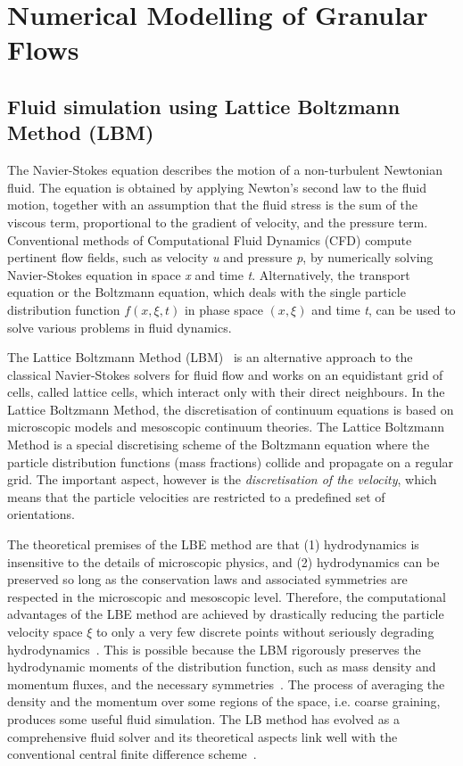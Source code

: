 \chapter{Numerical Modelling of Granular Flows}
\section{Fluid simulation using Lattice Boltzmann Method (LBM)}
The Navier-Stokes equation describes the motion of a non-turbulent Newtonian fluid. The equation is obtained by applying Newton's second law to the fluid motion, together with an assumption that the fluid stress is the sum of the viscous term, proportional to the gradient of velocity, and the pressure term. Conventional methods of Computational Fluid Dynamics (CFD) compute pertinent flow fields, such as velocity \textit{u} and pressure \textit{p}, by numerically solving Navier-Stokes equation in space \textit{x} and time \textit{t}. Alternatively, the transport equation or the Boltzmann equation, which deals with the single particle distribution function $f(x,\xi,t)$ in phase space $(x,\xi)$ and time \textit{t}, can be used to solve various problems in fluid dynamics. 

The Lattice Boltzmann Method (LBM)~\citep{He1997a,He1997b,Chen1998,Mei2000,Han2007,Zhou2012} is an alternative approach to the classical Navier-Stokes solvers for fluid flow and works on an equidistant grid of cells, called lattice cells, which interact only with their direct neighbours. In the Lattice Boltzmann Method, the discretisation of continuum equations is based on microscopic models and mesoscopic continuum theories. The Lattice Boltzmann Method is a special discretising scheme of the Boltzmann equation where the particle distribution functions (mass fractions) collide and propagate on a regular grid. The important aspect, however is the \textit{discretisation of the velocity}, which means that the particle velocities are restricted to a predefined set of orientations.

The theoretical premises of the LBE method are that (1) hydrodynamics is insensitive to the details of microscopic physics, and (2) hydrodynamics can be preserved so long as the conservation laws and associated symmetries are respected in the microscopic and mesoscopic level. Therefore, the computational advantages of the LBE method are achieved by drastically reducing the particle velocity space $\xi$ to only a very few discrete points without seriously degrading hydrodynamics~\citep{Mei2000}. This is possible because the LBM rigorously preserves the hydrodynamic moments of the distribution function, such as mass density and momentum fluxes, and the necessary symmetries~\citep{He1997a,He1997b}. The process of averaging the density and the momentum over some regions of the space, i.e. coarse graining, produces some useful fluid simulation. The LB method has evolved as a comprehensive fluid solver and its theoretical aspects link well with the conventional central finite difference scheme~\citep{Cook2004}.

